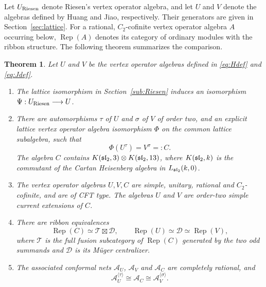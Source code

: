 \documentclass[11pt,reqno]{amsart}
\newtheorem{theorem}{Theorem}[section]
\theoremstyle{definition}\newtheorem{definition}[theorem]{Definition}
\theoremstyle{remark}\newtheorem{remark}[theorem]{Remark}
\newcommand{\Rep}{\operatorname{Rep}}
\newcommand{\Tc}{\mathcal T}\newcommand{\D}{\mathcal D}
\numberwithin{equation}{section}
\begin{document}
Let $U_{\rm Riesen}$ denote Riesen's vertex operator algebra, and let $U$ and $V$ denote the algebras defined by Huang and Jiao, respectively. Their generators are given in Section~\ref{sec:lattice}. For a rational, $C_2$-cofinite vertex operator algebra $A$ occurring below, $\Rep(A)$ denotes its category of ordinary modules with the ribbon structure. The following theorem summarizes the comparison.

\begin{theorem}\label{thm:main}
Let $U$ and $V$ be the vertex operator algebras defined in \eqref{eq:Hdef} and \eqref{eq:Jdef}.
\begin{enumerate}
\item The lattice isomorphism in Section~\ref{sub:Riesen} induces an isomorphism $\Psi:U_{\rm Riesen}\longrightarrow U$.
\item There are automorphisms $\tau$ of $U$ and $\sigma$ of $V$ of order two, and an explicit lattice vertex operator algebra isomorphism $\Phi$ on the common lattice subalgebra, such that
\[
 \Phi(U^\tau)=V^\sigma=:C.
\]
The algebra $C$ contains $K(\mathfrak{sl}_2,3)\otimes K(\mathfrak{sl}_2,13)$, where $K(\mathfrak{sl}_2,k)$ is the commutant of the Cartan Heisenberg algebra in $L_{\mathfrak{sl}_2}(k,0)$.
\item The vertex operator algebras $U,V,C$ are simple, unitary, rational and $C_2$-cofinite, and are of CFT type. The algebras $U$ and $V$ are order-two simple current extensions of $C$.
\item There are ribbon equivalences
\[
 \Rep(C)\simeq\Tc\boxtimes\D,
 \qquad \Rep(U)\simeq\D\simeq\Rep(V),
\]
{where $\Tc$ is the full fusion subcategory of $\Rep(C)$ generated by the two odd summands and $\D$ is its M\"uger centralizer.}
\item The associated conformal nets $\mathcal A_U$, $\mathcal A_V$ and $\mathcal A_C$ are completely rational, and
\[
 \mathcal A_U^{\langle\tau\rangle}\cong\mathcal A_C
       \cong\mathcal A_V^{\langle\sigma\rangle}.
\]
\end{enumerate}
\end{theorem}
\end{document}
